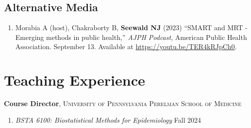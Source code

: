 \documentclass[letterpaper,11pt]{article} %
\begin{document}
        \subsection*{Alternative Media}
        \begin{enumerate}
            \item Morabia A (host), Chakraborty B, \textbf{Seewald NJ} (2023) ``SMART and MRT - Emerging methods in public health,'' \textit{AJPH Podcast}, American Public Health Association. September 13. Available at \url{https://youtu.be/TER4kRJpCh0}.
        \end{enumerate}
		
	
	\section*{Teaching Experience}
	
	
		\textbf{Course Director}, \textsc{University of Pennsylvania Perelman School of Medicine}
		\begin{enumerate}
			\item \textit{BSTA 6100: Biostatistical Methods for Epidemiology} \hfill Fall 2024
		\end{enumerate}
	
\end{document}

